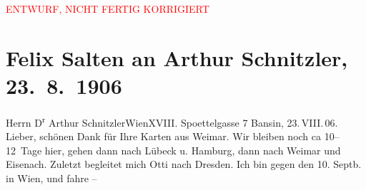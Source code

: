 
\begin{center}
            \textcolor{red}{ENTWURF, NICHT FERTIG KORRIGIERT}
                      \end{center}
            
         
         \renewcommand{\erwaehntePersonen}{Personen: Richard Metzl, Ottilie Salten}
         \renewcommand{\erwaehnteOrte}{Orte: Adriatisches Meer, Bansin, Dresden, Edmund-Weiß-Gasse, Eisenach, Hamburg, Kantstraße, Lübeck, Reichenau an der Rax, Venedig, Weimar, Wien}
         \renewcommand{\erwaehnteWerke}{}
               \section[Felix Salten an Arthur Schnitzler, 23. 8. 1906]{ Felix Salten an Arthur Schnitzler, 23. 8. 1906}\nopagebreak{}\rehead{ }\begin{ledgroupsized}[t]{13cm}\normalsize\beginnumbering \toendnotes[C]{\smallbreak\pagebreak[2]} 
\toendnotes[C]{\smallbreak}\pstart{}{\pb}Herrn D\textsuperscript{r} Arthur Schnitzler\pend{}\pstart{}Wien\pend{}\pstart{}XVIII. Spoettelgasse 7\pend{}{\bigskip}\pstart
           \raggedleft{}{\pb}Bansin, 23. VIII. 06.
               \pend
           \pstart
           Lieber, schönen Dank für Ihre Karten aus Weimar. Wir bleiben noch ca 10–12 Tage hier, gehen dann nach Lübeck u. Hamburg, dann
               nach Weimar und Eisenach. Zuletzt begleitet mich Otti
               nach Dresden. Ich bin gegen den 10.
                  Septb. in Wien, und fahre –

\end{ledgroupsized}
